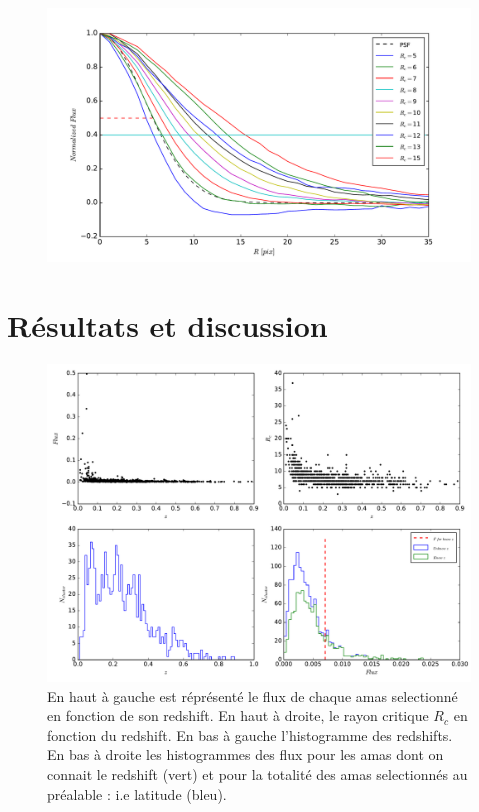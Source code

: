 \documentclass[a4paper,11pt]{article}
\begin{document}
\begin{figure}[h!]
  \centering
  \label{radius}
  \includegraphics[scale = 0.5]{radius.pdf}
  \caption{}
\end{figure}

\section{Résultats et discussion}

\begin{figure}[h!]
  \centering
  \label{rslt_1}
  \includegraphics[scale = 0.4]{rslt_1.pdf}
  \caption{En haut à gauche est réprésenté le flux de chaque amas
    selectionné en fonction de son redshift. En haut à droite, le rayon critique
    $R_c$ en fonction du redshift. En bas à gauche l'histogramme des
    redshifts. En bas à droite les histogrammes des flux pour les amas
    dont on connait le redshift (vert) et pour la totalité des amas
    selectionnés au préalable : i.e latitude (bleu).}
\end{figure}
\end{document}
